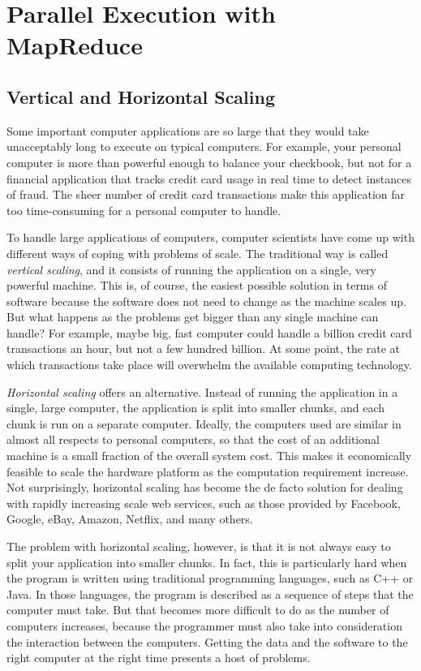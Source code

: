 \chapter{Parallel Execution with MapReduce}

\section{Vertical and Horizontal Scaling}

Some important computer applications are so large that they would take
unacceptably long to execute on typical computers.  For
example, your personal computer is more than powerful enough
to balance your checkbook, but not for a financial
application that tracks credit card usage in real time to
detect instances of fraud.  The sheer number of credit card
transactions make this application far too time-consuming for a
personal computer to handle.

To handle large applications of computers,
computer scientists have come up with different ways of coping
with problems of scale.  The traditional way is called
\emph{vertical scaling}, and it consists of running the
application on a single, very powerful machine.
This is, of course, the easiest possible solution in terms of software
because the software does not need to change as the machine scales up. 
But what happens as the problems get bigger than any single machine can handle?  
For example, maybe big, fast computer could handle 
a billion credit card transactions an hour,
but not a few hundred billion. 
At some point, the rate at which transactions take place
will overwhelm the available computing technology.

\emph{Horizontal scaling} offers an alternative.  Instead of
running the application in a single, large computer, 
the application is split into smaller
chunks, and each chunk is run on a separate computer.
Ideally, the computers used are similar in almost all respects
to personal computers, so that the cost of an additional
machine is a small fraction of the overall system cost.  
This makes it economically feasible to scale the
hardware platform as the computation requirement increase.  
Not surprisingly, horizontal scaling has become the de facto
solution for dealing with rapidly increasing scale web services, 
such as those provided by Facebook, Google, eBay, Amazon, Netflix, and many others.

The problem with horizontal scaling, however, is that it is
not always easy to split your application into smaller
chunks.  In fact, this is particularly hard when the program
is written using traditional programming languages, such as
C++ or Java.  In those languages, the program is described as
a sequence of steps that the computer must take.  But that
becomes more difficult to do as the number of computers
increases, because the programmer must also take into
consideration the interaction between the computers.
Getting the data and the software to the right computer
at the right time presents a host of problems.

